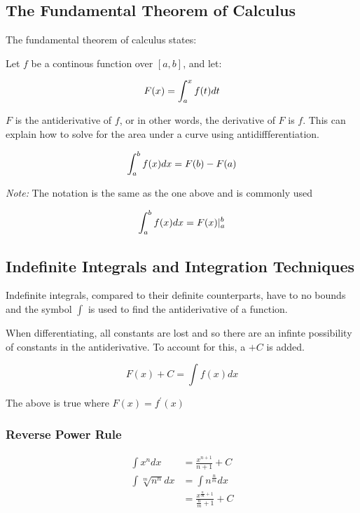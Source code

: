 \documentclass[12pt]{article}
\begin{document}
        \subsection{The Fundamental Theorem of Calculus}

        The fundamental theorem of calculus states:

        Let $f$ be a continous function over $[a, b]$, and let:

        \[
            F(x) = \int_a^x f(t) \space dt    
        \]

        $F$ is the antiderivative of $f$, or in other words, the derivative of $F$ is $f$. This can 
        explain how to solve for the area under a curve using antidiffferentiation.

        \[
            \int_a^b f(x) \space dx = F(b) - F(a)    
        \]

        \noindent \textit{Note:} The notation is the same as the one above and is commonly used

        \[
            \int_a^b f(x) \space dx = F(x) {|}_a^b   
        \]

        \subsection{Indefinite Integrals and Integration Techniques}

        Indefinite integrals, compared to their definite counterparts, have to no bounds
        and the symbol $\int$ is used to find the antiderivative of a function. 

        When differentiating, all constants are lost and so there are an infinte possibility
        of constants in the antiderivative. To account for this, a $+C$ is added.

        \[
            F(x) + C = \int f(x)dx    
        \]

        The above is true where $F(x) = f^{\prime}(x)$


        \subsubsection{Reverse Power Rule}

        \[
            \begin{aligned}
                \int x^n dx &= \frac{x^{n + 1}}{n + 1} + C\\
                \int \sqrt[m]{n^n} dx &= \int n^{\frac{n}{m}} dx\\
                &= \frac{x^{\frac{n}{m} + 1}}{\frac{n}{m} + 1} + C
            \end{aligned}    
        \]
\end{document}
